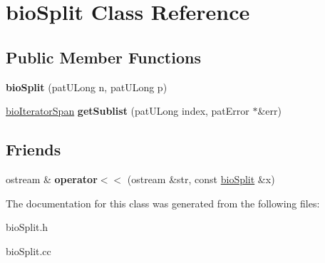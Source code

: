 \hypertarget{classbio_split}{}\section{bio\+Split Class Reference}
\label{classbio_split}
\subsection*{Public Member Functions}
\begin{DoxyCompactItemize}
\item 
\mbox{\label{classbio_split_a367cb31d98954a68a95449fbdb7a2b54}} 
{\bfseries bio\+Split} (pat\+U\+Long n, pat\+U\+Long p)
\item 
\mbox{\label{classbio_split_a19691a29628ea68f2673e2edcf909441}} 
\hyperlink{classbio_iterator_span}{bio\+Iterator\+Span} {\bfseries get\+Sublist} (pat\+U\+Long index, pat\+Error $\ast$\&err)
\end{DoxyCompactItemize}
\subsection*{Friends}
\begin{DoxyCompactItemize}
\item 
\mbox{\label{classbio_split_aa0a8b1d72d80a10e0439199aa6e92fa3}} 
ostream \& {\bfseries operator$<$$<$} (ostream \&str, const \hyperlink{classbio_split}{bio\+Split} \&x)
\end{DoxyCompactItemize}


The documentation for this class was generated from the following files\+:\begin{DoxyCompactItemize}
\item 
bio\+Split.\+h\item 
bio\+Split.\+cc\end{DoxyCompactItemize}

